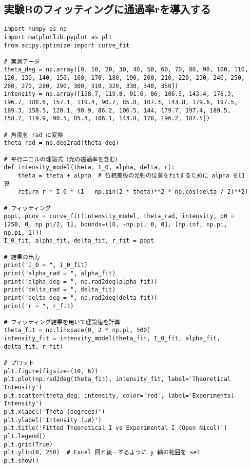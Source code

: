 \documentclass{article}
\begin{document}
\subsection*{実験Bのフィッティングに通過率rを導入する}
\begin{lstlisting}
import numpy as np
import matplotlib.pyplot as plt
from scipy.optimize import curve_fit

# 実測データ
theta_deg = np.array([0, 10, 20, 30, 40, 50, 60, 70, 80, 90, 100, 110, 120, 130, 140, 150, 160, 170, 180, 190, 200, 210, 220, 230, 240, 250, 260, 270, 280, 290, 300, 310, 320, 330, 340, 350])
intensity = np.array([158.7, 119.8, 91.6, 86, 106.5, 143.4, 178.3, 196.7, 188.6, 157.1, 119.4, 90.7, 85.8, 107.3, 143.8, 179.6, 197.5, 189.3, 158.5, 120.1, 90.9, 86.2, 106.5, 144, 179.7, 197.4, 189.5, 158.7, 119.9, 90.5, 85.3, 106.1, 143.8, 178, 196.2, 187.5])

# 角度を rad に変換
theta_rad = np.deg2rad(theta_deg)

# 平行ニコルの理論式（光の透過率を含む）
def intensity_model(theta, I_0, alpha, delta, r):
    theta = theta + alpha  # 位相差板の光軸の位置をfitするために alpha を加算
    return r * I_0 * (1 - np.sin(2 * theta)**2 * np.cos(delta / 2)**2)

# フィッティング
popt, pcov = curve_fit(intensity_model, theta_rad, intensity, p0 = [250, 0, np.pi/2, 1], bounds=([0, -np.pi, 0, 0], [np.inf, np.pi, np.pi, 1]))
I_0_fit, alpha_fit, delta_fit, r_fit = popt

# 結果の出力
print("I_0 = ", I_0_fit)
print("alpha_rad = ", alpha_fit)
print("alpha_deg = ", np.rad2deg(alpha_fit))
print("delta_rad = ", delta_fit)
print("delta_deg = ", np.rad2deg(delta_fit))
print("r = ", r_fit)

# フィッティング結果を用いて理論値を計算
theta_fit = np.linspace(0, 2 * np.pi, 500)
intensity_fit = intensity_model(theta_fit, I_0_fit, alpha_fit, delta_fit, r_fit)

# プロット
plt.figure(figsize=(10, 6))
plt.plot(np.rad2deg(theta_fit), intensity_fit, label='Theoretical Intensity')
plt.scatter(theta_deg, intensity, color='red', label='Experimental Intensity')
plt.xlabel('Theta (degrees)')
plt.ylabel('Intensity (μW)')
plt.title('Fitted Theoretical I vs Experimental I (Open Nicol)')
plt.legend()
plt.grid(True)
plt.ylim(0, 250)  # Excel 図と統一するように y 軸の範囲を set
plt.show()
\end{lstlisting}
\end{document}
